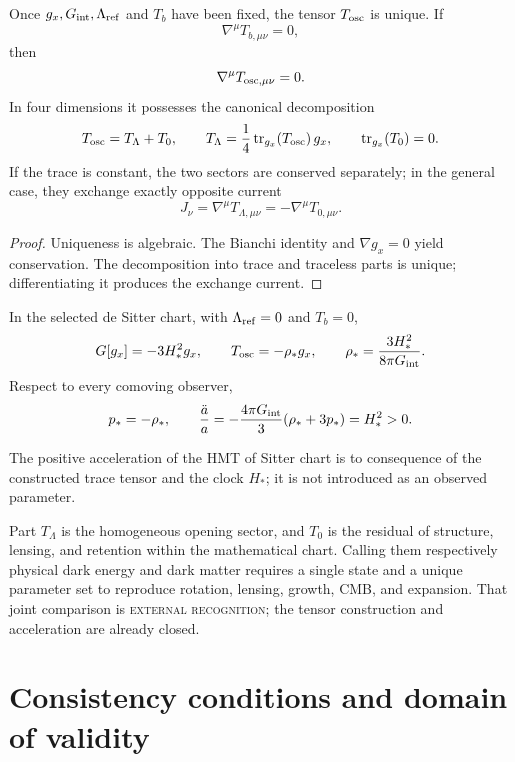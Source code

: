 \begin{theorem}
\label{thm:hmtf2-tensor-oscuro}
Once \(g_x,G_{\rm int},\Lambda_{\rm ref}\) and \(T_b\) have been fixed, the tensor
\(T_{\rm osc}\) is unique. If
\[
 \nabla^\mu T_{b,\mu\nu}=0,
 \]
then
\[
 \nabla^\mu T_{{\rm osc},\mu\nu}=0.
\]
In four dimensions it possesses the canonical decomposition
\[
 T_{\rm osc}=T_\Lambda+T_0,\qquad
 T_\Lambda=\frac14\operatorname{tr}_{g_x}(T_{\rm osc})\,g_x,\qquad
 \operatorname{tr}_{g_x}(T_0)=0.
\]
If the trace is constant, the two sectors are conserved separately; in the
general case, they exchange exactly opposite current
\[
 J_\nu=\nabla^\mu T_{\Lambda,\mu\nu}
 =-\nabla^\mu T_{0,\mu\nu}.
\]
\end{theorem}

\begin{proof}
Uniqueness is algebraic. The Bianchi identity and
\(\nabla g_x=0\) yield conservation. The decomposition into trace and
traceless parts is unique; differentiating it produces the exchange current.
\end{proof}

In the selected de Sitter chart, with
\(\Lambda_{\rm ref}=0\) and \(T_b=0\),
\[
 G[g_x]=-3H_*^2g_x,\qquad
 T_{\rm osc}=-\rho_*g_x,\qquad
 \rho_*=\frac{3H_*^2}{8\pi G_{\rm int}}.
\]
Respect to every comoving observer,
\[
 p_*=-\rho_*,
 \qquad
 \frac{\ddot a}{a}
 =-\frac{4\pi G_{\rm int}}3(\rho_*+3p_*)=H_*^2>0.
\]

\begin{corollary}
\label{cor:hmtf2-aceleracion}
The positive acceleration of the HMT of Sitter chart is to consequence of the
constructed trace tensor and the clock \(H_*\); it is not introduced as
an observed parameter.
\end{corollary}

Part \(T_\Lambda\) is the homogeneous opening sector, and \(T_0\) is the
residual of structure, lensing, and retention within the mathematical chart.
Calling them respectively physical dark energy and dark matter requires
a single state and a unique parameter set to reproduce rotation,
lensing, growth, CMB, and expansion. That joint comparison is
\textsc{external recognition}; the tensor construction and acceleration
are already closed.

\section{Consistency conditions and domain of validity}
\label{sec:hmtf2-falsadores}

